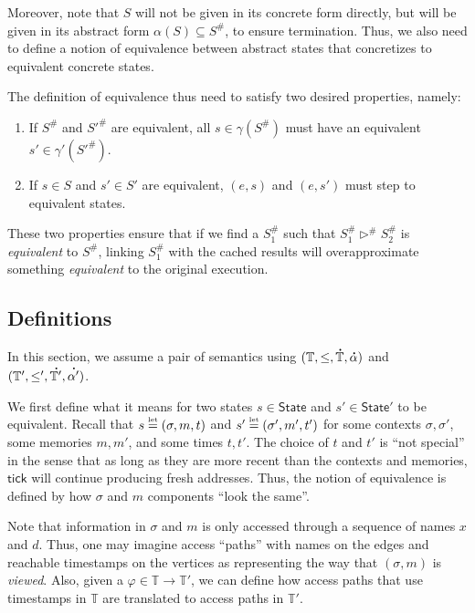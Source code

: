 \documentclass[acmsmall,screen,review]{acmart}\settopmatter{printfolios=true,printccs=false,printacmref=false}
\theoremstyle{acmdefinition}
\newcommand*{\A}[1]{\overset{\,_{\mbox{\Large .}}}{#1}}
\newcommand*{\Abs}[1]{{#1}^{\#}}
\newcommand*{\modid}{d}
\newcommand*{\Time}{\mathbb{T}}
\newcommand*{\ATime}{\A{\Time}}
\newcommand*{\ctx}{\sigma}
\newcommand*{\mem}{m}
\newcommand*{\texteq}[1]{\stackrel{\mathclap{\tiny\normalfont\mbox{#1}}}{=}}
\newcommand*{\State}{\mathsf{State}}
\newcommand*{\tick}{\mathsf{tick}}
\begin{document}
Moreover, note that $S$ will not be given in its concrete form directly, but will be given in its abstract form $\alpha(S)\subseteq\Abs{S}$, to ensure termination.
Thus, we also need to define a notion of equivalence between abstract states that concretizes to equivalent concrete states.

The definition of equivalence thus need to satisfy two desired properties, namely:
\begin{enumerate}
  \item If $\Abs{S}$ and $\Abs{S'}$ are equivalent, all $s\in\gamma(\Abs{S})$ must have an equivalent $s'\in\gamma'(\Abs{S'})$.
  \item If $s\in S$ and $s'\in S'$ are equivalent, $(e,s)$ and $(e,s')$ must step to equivalent states.
\end{enumerate}
These two properties ensure that if we find a $\Abs{S}_1$ such that ${\Abs{S}_1}\Abs\rhd{\Abs{S}_2}$ is \emph{equivalent} to $\Abs{S}$, linking $\Abs{S}_1$ with the cached results will overapproximate something \emph{equivalent} to the original execution.

\subsection{Definitions}
In this section, we assume a pair of semantics using $(\Time,\le,\ATime,\A\alpha)$ and $(\Time',\le',\A{\Time'},\A{\alpha'})$.

We first define what it means for two states $s\in\State$ and $s'\in\State'$ to be equivalent.
Recall that $s\texteq{let}(\ctx,\mem,t)$ and $s'\texteq{let}(\ctx',\mem',t')$ for some contexts $\ctx,\ctx'$, some memories $\mem,\mem'$, and some times $t,t'$.
The choice of $t$ and $t'$ is ``not special'' in the sense that as long as they are more recent than the contexts and memories, $\tick$ will continue producing fresh addresses.
Thus, the notion of equivalence is defined by how $\ctx$ and $\mem$ components ``look the same''.

Note that information in $\ctx$ and $\mem$ is only accessed through a sequence of names $x$ and $\modid$.
Thus, one may imagine access ``paths'' with names on the edges and reachable timestamps on the vertices as representing the way that $(\ctx,\mem)$ is \emph{viewed}.
Also, given a $\varphi\in\Time\rightarrow\Time'$, we can define how access paths that use timestamps in $\Time$ are translated to access paths in $\Time'$.
\end{document}
